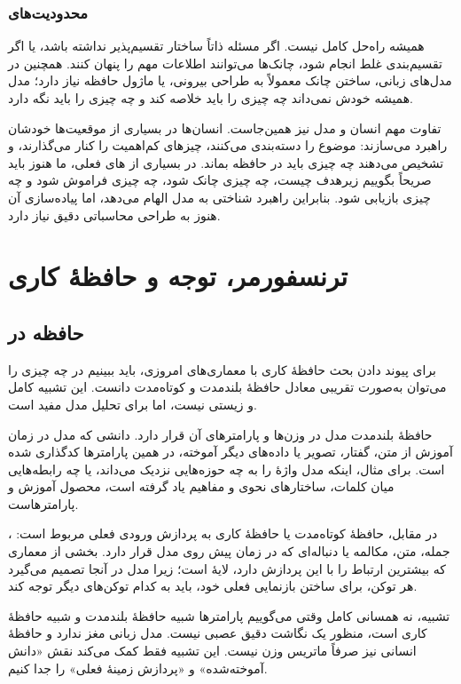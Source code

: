 \subsubsection{محدودیت‌های }
 همیشه راه‌حل کامل نیست. اگر مسئله ذاتاً ساختار تقسیم‌پذیر نداشته باشد، یا اگر تقسیم‌بندی غلط انجام شود، چانک‌ها می‌توانند اطلاعات مهم را پنهان کنند. همچنین در مدل‌های زبانی، ساختن چانک معمولاً به طراحی بیرونی،  یا ماژول حافظه نیاز دارد؛ مدل همیشه خودش نمی‌داند چه چیزی را باید خلاصه کند و چه چیزی را باید نگه دارد.

تفاوت مهم انسان و مدل نیز همین‌جاست. انسان‌ها در بسیاری از موقعیت‌ها خودشان راهبرد می‌سازند: موضوع را دسته‌بندی می‌کنند، چیزهای کم‌اهمیت را کنار می‌گذارند، و تشخیص می‌دهند چه چیزی باید در حافظه بماند. در بسیاری از های فعلی، ما هنوز باید صریحاً بگوییم زیرهدف چیست، چه چیزی چانک شود، چه چیزی فراموش شود و چه چیزی بازیابی شود. بنابراین راهبرد شناختی به مدل الهام می‌دهد، اما پیاده‌سازی آن هنوز به طراحی محاسباتی دقیق نیاز دارد.

\section{ترنسفورمر، توجه و حافظهٔ کاری}

\subsection{حافظه در }
برای پیوند دادن بحث حافظهٔ کاری با معماری‌های امروزی، باید ببینیم در  چه چیزی را می‌توان به‌صورت تقریبی معادل حافظهٔ بلندمدت و کوتاه‌مدت دانست. این تشبیه کامل و زیستی نیست، اما برای تحلیل مدل مفید است.

حافظهٔ بلندمدت مدل در وزن‌ها و پارامترهای آن قرار دارد. دانشی که مدل در زمان آموزش از متن، گفتار، تصویر یا داده‌های دیگر آموخته، در همین پارامترها کدگذاری شده است. برای مثال، اینکه مدل واژهٔ  را به چه حوزه‌هایی نزدیک می‌داند، یا چه رابطه‌هایی میان کلمات، ساختارهای نحوی و مفاهیم یاد گرفته است، محصول آموزش و پارامترهاست.

در مقابل، حافظهٔ کوتاه‌مدت یا حافظهٔ کاری به پردازش ورودی فعلی مربوط است: ، جمله، متن، مکالمه یا دنباله‌ای که در زمان  پیش روی مدل قرار دارد. بخشی از معماری که بیشترین ارتباط را با این پردازش دارد، لایهٔ  است؛ زیرا مدل در آنجا تصمیم می‌گیرد هر توکن، برای ساختن بازنمایی فعلی خود، باید به کدام توکن‌های دیگر توجه کند.

\begin{correctionbox}{تشبیه، نه همسانی کامل}
وقتی می‌گوییم پارامترها شبیه حافظهٔ بلندمدت و  شبیه حافظهٔ کاری است، منظور یک نگاشت دقیق عصبی نیست. مدل زبانی مغز ندارد و حافظهٔ انسانی نیز صرفاً ماتریس وزن نیست. این تشبیه فقط کمک می‌کند نقش «دانش آموخته‌شده» و «پردازش زمینهٔ فعلی» را جدا کنیم.
\end{correctionbox}


